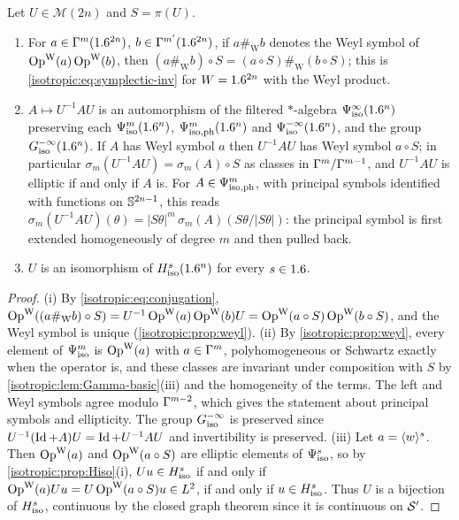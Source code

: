 \begin{corollary}\label{isotropic:cor:conj-calculus}
Let $U\in\mathcal M(2n)$ and $S=\pi(U)$.
\begin{enumerate}[label=\textup{(\roman*)}]
\item For $a\in\Gamma^{m}(1.6^{2n})$, $b\in\Gamma^{m'}(1.6^{2n})$, if $a\#_{\mathrm W}b$
  denotes the Weyl symbol of $\operatorname{Op}^{\mathrm{W}}(a)\operatorname{Op}^{\mathrm{W}}(b)$, then
  $(a\#_{\mathrm W}b)\circ S=(a\circ S)\#_{\mathrm W}(b\circ S)$; this is
  \eqref{isotropic:eq:symplectic-inv} for $W=1.6^{2n}$ with the Weyl product.
\item $A\mapsto U^{-1}AU$ is an automorphism of the filtered $*$-algebra
  $\Psi^{\infty}_{\mathrm{iso}}(1.6^n)$ preserving each $\Psi^{m}_{\mathrm{iso}}(1.6^n)$, $\Psi^{m}_{\mathrm{iso,ph}}(1.6^n)$
  and $\Psi^{-\infty}_{\mathrm{iso}}(1.6^n)$, and the group $G^{-\infty}_{\mathrm{iso}}(1.6^n)$. If $A$ has Weyl
  symbol $a$ then $U^{-1}AU$ has Weyl symbol $a\circ S$; in particular
  $\sigma_m(U^{-1}AU)=\sigma_m(A)\circ S$ as classes in $\Gamma^{m}/\Gamma^{m-1}$, and
  $U^{-1}AU$ is elliptic if and only if $A$ is. For $A\in\Psi^{m}_{\mathrm{iso,ph}}$, with
  principal symbols identified with functions on $\mathbb{S}^{2n-1}$, this reads
  $\sigma_m(U^{-1}AU)(\theta)=|S\theta|^m\,\sigma_m(A)(S\theta/|S\theta|)$: the
  principal symbol is first extended homogeneously of degree $m$ and then
  pulled back.
\item $U$ is an isomorphism of $H^{s}_{\mathrm{iso}}(1.6^n)$ for every $s\in1.6$.
\end{enumerate}
\end{corollary}
\begin{proof}
(i) By \eqref{isotropic:eq:conjugation},
$\operatorname{Op}^{\mathrm{W}}((a\#_{\mathrm W}b)\circ S)=U^{-1}\operatorname{Op}^{\mathrm{W}}(a)\operatorname{Op}^{\mathrm{W}}(b)U=\operatorname{Op}^{\mathrm{W}}(a\circ S)\operatorname{Op}^{\mathrm{W}}(b\circ S)$,
and the Weyl symbol is unique (\cref{isotropic:prop:weyl}). (ii) By
\cref{isotropic:prop:weyl}, every element of $\Psi^{m}_{\mathrm{iso}}$ is $\operatorname{Op}^{\mathrm{W}}(a)$ with
$a\in\Gamma^{m}$, polyhomogeneous or Schwartz exactly when the operator is, and
these classes are invariant under composition with $S$ by
\cref{isotropic:lem:Gamma-basic}(iii) and the homogeneity of the terms. The left
and Weyl symbols agree modulo $\Gamma^{m-2}$, which gives the statement about
principal symbols and ellipticity. The group $G^{-\infty}_{\mathrm{iso}}$ is preserved since
$U^{-1}(\operatorname{Id}+A)U=\operatorname{Id}+U^{-1}AU$ and invertibility is preserved. (iii) Let
$a=\langle w\rangle^s$. Then $\operatorname{Op}^{\mathrm{W}}(a)$ and $\operatorname{Op}^{\mathrm{W}}(a\circ S)$ are elliptic elements of
$\Psi^{s}_{\mathrm{iso}}$, so by \cref{isotropic:prop:Hiso}(i),
$Uu\in H^{s}_{\mathrm{iso}}$ if and only if $\operatorname{Op}^{\mathrm{W}}(a)Uu=U\operatorname{Op}^{\mathrm{W}}(a\circ S)u\in L^2$, if and only
if $u\in H^{s}_{\mathrm{iso}}$. Thus $U$ is a bijection of $H^{s}_{\mathrm{iso}}$, continuous by the
closed graph theorem since it is continuous on $\mathcal{S}'$.
\end{proof}

